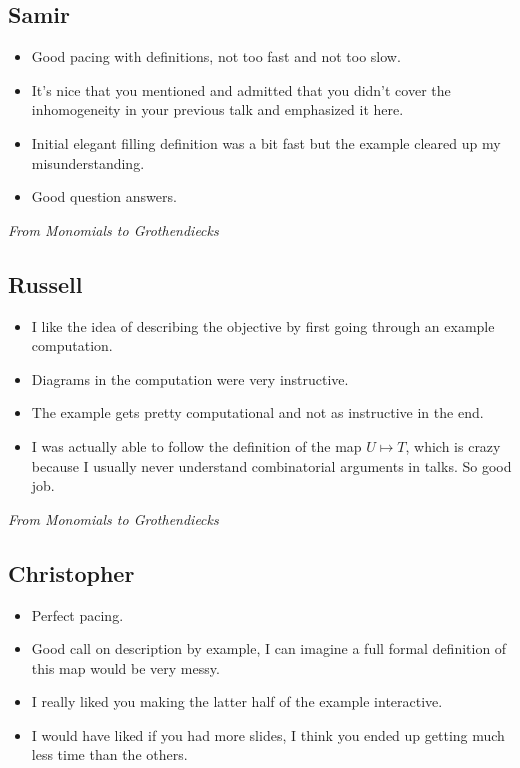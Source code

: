 \documentclass[12pt]{article}
\begin{document}
\subsection*{Samir}
\begin{itemize}
  \item Good pacing with definitions, not too fast and not too slow.
  \item It's nice that you mentioned and admitted that you didn't cover the inhomogeneity in your previous talk and emphasized it here.
  \item Initial elegant filling definition was a bit fast but the example cleared up my misunderstanding.
  \item Good question answers.
\end{itemize}
\newpage


\begin{center}
  \Large\textit{From Monomials to Grothendiecks}
\end{center}


\subsection*{Russell}
\begin{itemize}
  \item I like the idea of describing the objective by first going through an example computation.
  \item Diagrams in the computation were very instructive.
  \item The example gets pretty computational and not as instructive in the end.
  \item I was actually able to follow the definition of the map $ U\mapsto T $, which is crazy because I usually never understand combinatorial arguments in talks. So good job.
\end{itemize}
\newpage

\begin{center}
  \Large\textit{From Monomials to Grothendiecks}
\end{center}


\subsection*{Christopher}
\begin{itemize}
  \item Perfect pacing.
  \item Good call on description by example, I can imagine a full formal definition of this map would be very messy.
  \item I really liked you making the latter half of the example interactive. 
  \item I would have liked if you had more slides, I think you ended up getting much less time than the others.
\end{itemize}
\end{document}
